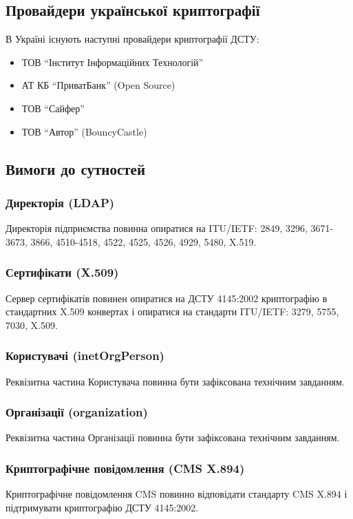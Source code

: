 \documentclass{article}
\begin{document}
\subsection{Провайдери української криптографії}
В Україні існують наступні провайдери криптографії ДСТУ:
\begin{itemize}
\item ТОВ ``Інститут Інформаційних Технологій''
\item АТ КБ ``ПриватБанк'' (Open Source)
\item ТОВ ``Сайфер''
\item ТОВ ``Автор'' (BouncyCastle)
\end{itemize}

\newpage
\subsection{Вимоги до сутностей}

\subsubsection{Директорія (LDAP)}
Директорія підприємства повинна опиратися на ITU/IETF: 2849, 3296, 3671-3673, 3866, 4510-4518, 4522, 4525, 4526, 4929, 5480, X.519.

\subsubsection{Сертифікати (X.509)}
Сервер сертифікатів повинен опиратися на ДСТУ 4145:2002 криптографію в стандартних X.509 конвертах і опиратися на стандарти ITU/IETF: 3279, 5755, 7030, X.509.

\subsubsection{Користувачі (inetOrgPerson)}
Реквізитна частина Користувача повинна бути зафіксована технічним завданням.

\subsubsection{Організації (organization)}
Реквізитна частина Організації повинна бути зафіксована технічним завданням.

\subsubsection{Криптографічне повідомлення (CMS X.894)}
Криптографічне повідомлення CMS повинно відповідати стандарту CMS X.894 і підтримувати криптографію ДСТУ 4145:2002.
\end{document}
